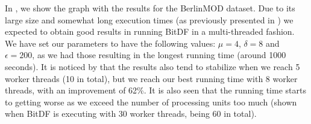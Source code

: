 {In , we show the graph with the results for the BerlinMOD dataset. Due to its large size
and somewhat long execution times (as previously presented in ) we expected to obtain good results
in running BitDF in a multi-threaded fashion. We have set our parameters to have the following values: $\mu=4$,
$\delta=8$ and $\epsilon=200$, as we had those resulting in the longest running time (around 1000 seconds). It is
noticed by  that the results also tend to stabilize when we reach 5 worker threads (10 in
total), but we reach our best running time with 8 worker threads, with an improvement of 62\%. It is also seen that the
running time starts to getting worse as we exceed the number of processing units too much (shown when BitDF is executing
with 30 worker threads, being 60 in total).

}
